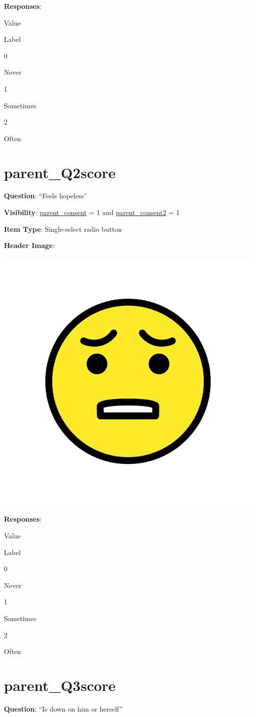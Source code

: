 \documentclass[]{book}
\begin{document}
\textbf{Responses}:

Value

Label

0

Never

1

Sometimes

2

Often

\hypertarget{parent_q2score}{%
\section{parent\_Q2score}\label{parent_q2score}}

\textbf{Question}: ``Feels hopeless''

\textbf{Visibility}: \protect\hyperlink{parent_consent}{parent\_consent} = 1 and \protect\hyperlink{parent_consent2}{parent\_consent2} = 1

\textbf{Item Type}: Single-select radio button

\textbf{Header Image}:

\begin{flushleft}\includegraphics[width=0.33\linewidth]{downloadFigs4latex_HBN_PMHS_Codebook/parent_Q2score_headerImg} \end{flushleft}

\textbf{Responses}:

Value

Label

0

Never

1

Sometimes

2

Often

\hypertarget{parent_q3score}{%
\section{parent\_Q3score}\label{parent_q3score}}

\textbf{Question}: ``Is down on him or herself''
\end{document}
